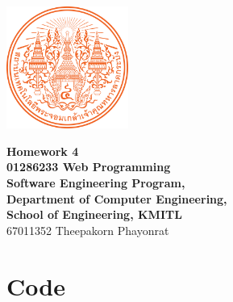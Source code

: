 \documentclass[12pt]{report} %
\begin{document}
\begin{titlepage}
	\centering
	\vspace*{1cm} %
	\includegraphics[width=0.3\textwidth]{../../images/KMITL Logo.png} %

	\vspace{1cm} %
	{\LARGE \textbf{Homework 4}} \\[0.5cm] %
	\vspace{0.5cm}
	{\large \textbf{01286233 Web Programming}} \\[0.5cm]
	{\large \textbf{Software Engineering Program,}} \\[0.5cm]
	{\large \textbf{Department of Computer Engineering,}} \\[0.5cm]
	{\large \textbf{School of Engineering, KMITL}} \\[1cm]
	{\Large 67011352 Theepakorn Phayonrat} \\[0.5cm] %
\end{titlepage}

\section*{Code}
\end{document}
